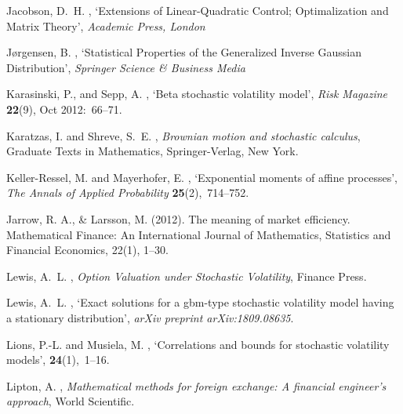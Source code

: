\documentclass[11pt,a4paper] {article}
\begin{document}
\begin{thebibliography}{}
Jacobson, D.~H.  \harvardyearright , `Extensions of Linear-Quadratic Control; Optimalization and Matrix Theory', {\em Academic Press, London}


J{\o}rgensen, B.  \harvardyearright , `Statistical Properties of the Generalized Inverse Gaussian Distribution', {\em Springer Science \& Business Media}
	
Karasinski, P., and Sepp, A.  \harvardyearright, `Beta stochastic volatility model', {\em Risk Magazine} {\bf 22}(9), Oct 2012:~66--71.
	
Karatzas, I. and Shreve, S.~E.  \harvardyearright
  , {\em Brownian motion and stochastic calculus}, Graduate Texts in
  Mathematics, Springer-Verlag, New York.

Keller-Ressel, M. and Mayerhofer, E.  \harvardyearright , `Exponential moments of affine processes', {\em The
  Annals of Applied Probability} {\bf 25}(2),~714--752.

Jarrow, R. A., \& Larsson, M. (2012). The meaning of market efficiency. Mathematical Finance: An International Journal of Mathematics, Statistics and Financial Economics, 22(1), 1--30.

Lewis, A.~L.  \harvardyearright , {\em Option Valuation
  under Stochastic Volatility}, Finance Press.


Lewis, A.~L.  \harvardyearright , `Exact solutions for a
  gbm-type stochastic volatility model having a stationary distribution', {\em
  arXiv preprint arXiv:1809.08635}.

Lions, P.-L. and Musiela, M.  \harvardyearright ,
  `Correlations and bounds for stochastic volatility models', {\bf
  24}(1),~1--16.

Lipton, A.  \harvardyearright , {\em Mathematical methods
  for foreign exchange: A financial engineer's approach}, World Scientific.


\end{thebibliography}
\end{document}
